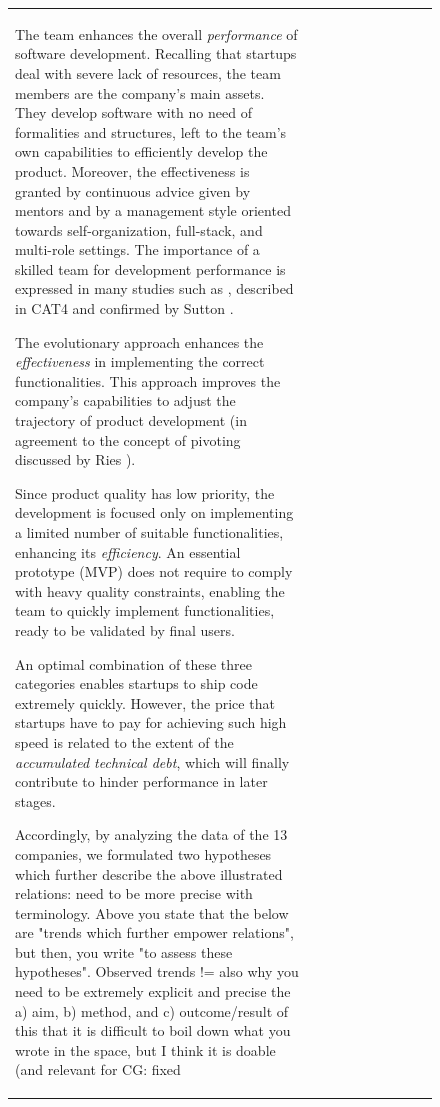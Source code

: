\documentclass[12pt,journal,compsoc]{../sty/IEEEtran}
\begin{document}
\begin{table}[!t]
\begin{figure}[!t]
\begin{compactitem}
\begin{table}[!t]
\begin{tabular}{|l||c||c||c||c||c||c||c||c||c|}
\begin{compactitem} \item The team enhances the overall \textit{performance} of
software  development. Recalling that startups deal with severe lack of
resources, the  team members are the company's main assets. They develop
software with no need  of formalities and structures, left to the team's own
capabilities to  efficiently develop the product. Moreover, the effectiveness is
granted by  continuous advice given by mentors and by a management style
oriented towards  self-organization, full-stack, and multi-role settings. The
importance of a  skilled team for development performance is expressed in many
studies such as  \cite{surviving-os-cockburn, Highsmith2000}, described in CAT4
and confirmed by  Sutton \cite{Sutton2000}. \item The evolutionary approach
enhances the \textit{effectiveness} in  implementing the correct
functionalities. This approach improves the company's  capabilities to adjust
the trajectory of product development (in agreement to  the concept of pivoting
discussed by Ries \cite{Ries2011}). \item Since product quality has low
priority, the development is focused only on  implementing a limited number of
suitable functionalities, enhancing its  \textit{efficiency}. An essential
prototype (MVP) does not require to comply  with heavy quality constraints,
enabling the team to quickly implement  functionalities, ready to be validated
by final users. \end{compactitem}

An optimal combination of these three categories enables startups to ship code
extremely quickly. However, the price that startups have to pay for achieving
such high speed is related to the extent of the \textit{accumulated technical
debt}, which will finally contribute to hinder performance in later stages.


Accordingly, by analyzing the data of the 13 companies, we formulated two
hypotheses which further describe the above illustrated relations: %
need to be more precise with terminology. Above you state that the  %
below are "trends which further empower relations", but then,  %
you write "to assess these hypotheses". Observed trends !=  %
also why you need to be extremely explicit and precise  %
the a) aim, b) method, and c) outcome/result of this  %
that it is difficult to boil down what you wrote in the  %
space, but I think it is doable (and relevant for  %
CG: fixed


\end{tabular}
\end{table}
\end{compactitem}
\end{figure}
\end{table}
\end{document}
